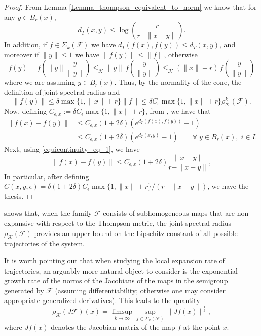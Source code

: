 \documentclass{article}
\newcommand{\family}{\mathcal{F}}
\newcommand{\cradius}{\rho_{\cone}}
\newcommand{\cone}{\mathcal{K}}
\newcommand{\distT}{d_T}
\newcommand{\cleq}{\leq_{\cone}}
\begin{document}
\begin{proof} 
    From Lemma \ref{Lemma_thompson_equivalent_to_norm} we know that for any $y\in B_r(x)$, 
%
\begin{equation}\label{equicontinuity_eq_1}
    \distT(x,y)\leq \log\left(\frac{r}{r-\|x-y\|}\right).
\end{equation}
%
In addition, if $f\in \Sigma_k(\family)$ we have $\distT(f(x),f(y))\leq \distT(x,y)$, and moreover if $\|y\|\leq 1$ we have $\|f(y)\|\leq \|f\|$, otherwise 
\begin{equation}
    f(y)= f\!\left(\|y\|\frac{y}{\|y\|}\right) \cleq \|y\|\, f\!\left(\frac{y}{\|y\|}\right)\cleq  (\|x\|+r)\, f\!\left(\frac{y}{\|y\|}\right) 
\end{equation}
where we are assuming $y\in B_r(x)$. Thus, by the normality of the cone, the definition of joint spectral radius and 
%
\begin{equation}
\|f(y)\|\leq \delta\max\{1,\|x\|+r\}\|f\|\leq \delta C_\epsilon \max\{1,\|x\|+r\}\cradius^k(\family).
\end{equation}
%
Now, defining $C_{\epsilon,x}:=\delta C_\epsilon \max\{1,\|x\|+r\}$, from , we have that 
%
\begin{equation}\label{eq_equicontinuity_1}
\begin{aligned}
    \|f(x)-f(y)\|
    &\leq  C_{\epsilon,x}(1+2\delta)(e^{\distT(f(x),f(y))}-1) \\
    &\leq C_{\epsilon,x}(1+2\delta) (e^{\distT(x,y)}-1)  \qquad \forall \;y\in B_r(x),\; i\in I.
\end{aligned}
\end{equation}
%
Next, using \eqref{equicontinuity_eq_1}, we have
\begin{equation}
    \|f(x)-f(y)\|\leq  C_{\epsilon,x}(1+2\delta)\frac{\|x-y\|}{r-\|x-y\|}, 
\end{equation}
In particular, after defining $C(x,y,\epsilon)=\delta(1+2\delta) C_\epsilon \max\{1,\|x\|+r\}/(r-\|x-y\|)$, we have the thesis.
%
\end{proof}
%
%
%


 shows that, when the family $\family$ consists of subhomogeneous maps that are non-expansive with respect to the Thompson metric, the joint spectral radius $\cradius(\family)$ provides an upper bound on the Lipschitz constant of all possible trajectories of the system.

It is worth pointing out that when studying the local expansion rate of trajectories, an arguably more natural object to consider is the exponential growth rate of the norms of the Jacobians of the maps in the semigroup generated by $\family$ (assuming differentiability; otherwise one may consider appropriate generalized derivatives). This leads to the quantity
\begin{equation}
\cradius(J\family)(x) = \limsup_{k\rightarrow\infty} \sup_{f \in \Sigma_k(\family)} \|Jf(x)\|^{\frac{1}{k}},
\end{equation}
where $Jf(x)$ denotes the Jacobian matrix of the map $f$ at the point $x$.
\end{document}
